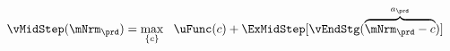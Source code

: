   \begin{equation}\begin{gathered}\begin{aligned}
        \vMidStep(\mNrm_{\prd}) & = \max_{\{{c}\}}~~\uFunc(c) +\ExMidStep[ \vEndStg(\overbrace{\mNrm_{\prd}-c}^{a_{\prd}})] \label{eq:vMidStep}
      \end{aligned}\end{gathered}\end{equation}
